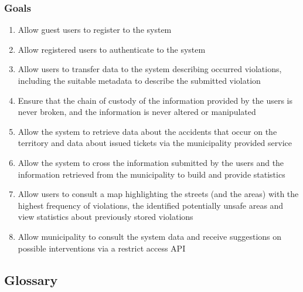 \subsubsection{Goals}
	\label{sec:goals}
	\begin{enumerate}[label=\textbf{G\arabic*}]
		\item \label{goal:register} Allow guest users to register to the system
		\item \label{goal:login} Allow registered users to authenticate to the system
		\item \label{goal:userTransfer} Allow users to transfer data to the system describing occurred violations, including the suitable metadata to describe the submitted violation
		\item \label{goal:avoidLeaks} Ensure that the chain of custody of the information provided by the users is never broken, and the information is never altered or manipulated
		\item \label{goal:municipalityTransfer} Allow the system to retrieve data about the accidents that occur on the territory and data about issued tickets via the municipality provided service
		\item \label{goal:statistics} Allow the system to cross the information submitted by the users and the information retrieved from the municipality to build and provide statistics
		\item \label{goal:consultMap} Allow users to consult a map highlighting the streets (and the areas) with the highest frequency of violations, the identified potentially unsafe areas and view statistics about previously stored violations
		\item \label{goal:retrieveData} Allow municipality to consult the system data and receive suggestions on possible interventions via a restrict access API 

	\end{enumerate}

\subsection{Glossary}
